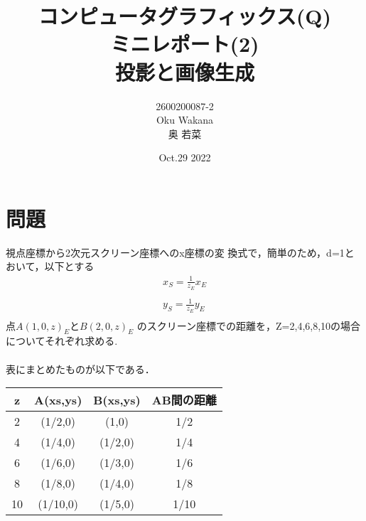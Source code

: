 \documentclass[dvipdfmx,autodetect-engine,titlepage]{jsarticle}
\title{コンピュータグラフィックス(Q)\\
ミニレポート(2)\\
投影と画像生成\\
}
\author{2600200087-2\\Oku Wakana\\奥 若菜}
\date{Oct.29 2022}
\begin{document}
\maketitle

\section*{問題}
視点座標から2次元スクリーン座標へのx座標の変
換式で，簡単のため，d=1とおいて，以下とする
\begin{eqnarray*}
  x_{S} = \frac{1}{z_{E}}x_{E} \\\\
  y_{S} = \frac{1}{z_{E}}y_{E} \\
\end{eqnarray*}
点\begin{math}
  A(1,0,z)_{E} と B(2,0,z)_{E}
\end{math}
のスクリーン座標での距離を，Z=2,4,6,8,10の場合についてそれぞれ求める.\\\\

表にまとめたものが以下である．\\

\begin{table}[H]
  \centering
  \begin{tabular}{|c|c|c|c|}
  \hline
  z  & A(xs,ys) & B(xs,ys) & AB間の距離 \\ \hline
  2  & (1/2,0)  & (1,0)    & 1/2    \\ \hline
  4  & (1/4,0)  & (1/2,0)  & 1/4    \\ \hline
  6  & (1/6,0)  & (1/3,0)  & 1/6    \\ \hline
  8  & (1/8,0)  & (1/4,0)  & 1/8    \\ \hline
  10 & (1/10,0) & (1/5,0)  & 1/10   \\ \hline
  \end{tabular}
  \end{table}
\end{document}
